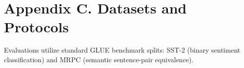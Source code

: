 \section*{Appendix C. Datasets and Protocols}
Evaluations utilize standard GLUE benchmark splits: SST-2 (binary sentiment classification) and MRPC (semantic sentence-pair equivalence).
